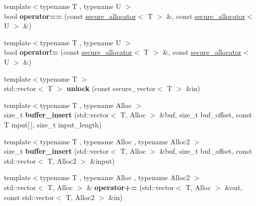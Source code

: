 \begin{DoxyCompactItemize}
\mbox{\label{namespace_botan_af642902e51060ac64f0278fcfaae25bc}} 
{\footnotesize template$<$typename T , typename U $>$ }\\bool {\bfseries operator==} (const \mbox{\hyperlink{class_botan_1_1secure__allocator}{secure\+\_\+allocator}}$<$ T $>$ \&, const \mbox{\hyperlink{class_botan_1_1secure__allocator}{secure\+\_\+allocator}}$<$ U $>$ \&)
\item 
\mbox{\label{namespace_botan_a0f4317d3fed122a6763016f7d0194925}} 
{\footnotesize template$<$typename T , typename U $>$ }\\bool {\bfseries operator!=} (const \mbox{\hyperlink{class_botan_1_1secure__allocator}{secure\+\_\+allocator}}$<$ T $>$ \&, const \mbox{\hyperlink{class_botan_1_1secure__allocator}{secure\+\_\+allocator}}$<$ U $>$ \&)
\item 
\mbox{\label{namespace_botan_a07b99a8cd5ed8949c8645dc15c8b6659}} 
{\footnotesize template$<$typename T $>$ }\\std\+::vector$<$ T $>$ {\bfseries unlock} (const secure\+\_\+vector$<$ T $>$ \&in)
\item 
\mbox{\label{namespace_botan_a19af9a711ecf7ae0dd3a64138fc6dc3b}} 
{\footnotesize template$<$typename T , typename Alloc $>$ }\\size\+\_\+t {\bfseries buffer\+\_\+insert} (std\+::vector$<$ T, Alloc $>$ \&buf, size\+\_\+t buf\+\_\+offset, const T input\mbox{[}$\,$\mbox{]}, size\+\_\+t input\+\_\+length)
\item 
\mbox{\label{namespace_botan_a22388053c63ffb34d665e5fcae148e14}} 
{\footnotesize template$<$typename T , typename Alloc , typename Alloc2 $>$ }\\size\+\_\+t {\bfseries buffer\+\_\+insert} (std\+::vector$<$ T, Alloc $>$ \&buf, size\+\_\+t buf\+\_\+offset, const std\+::vector$<$ T, Alloc2 $>$ \&input)
\item 
\mbox{\label{namespace_botan_a9bbc58ad326d5e720297c3f29a1d9dd1}} 
{\footnotesize template$<$typename T , typename Alloc , typename Alloc2 $>$ }\\std\+::vector$<$ T, Alloc $>$ \& {\bfseries operator+=} (std\+::vector$<$ T, Alloc $>$ \&out, const std\+::vector$<$ T, Alloc2 $>$ \&in)

\end{DoxyCompactItemize}
